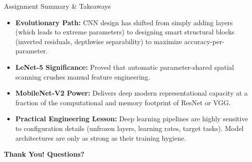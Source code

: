 \documentclass[aspectratio=169, 10pt]{beamer}
\begin{document}
\begin{frame}{Assignment Summary & Takeaways}
    \begin{itemize}
        \item \textbf{Evolutionary Path:} CNN design has shifted from simply adding layers (which leads to extreme parameters) to designing smart structural blocks (inverted residuals, depthwise separability) to maximize accuracy-per-parameter.
        \item \textbf{LeNet-5 Significance:} Proved that automatic parameter-shared spatial scanning crushes manual feature engineering.
        \item \textbf{MobileNet-V2 Power:} Delivers deep modern representational capacity at a fraction of the computational and memory footprint of ResNet or VGG.
        \item \textbf{Practical Engineering Lesson:} Deep learning pipelines are highly sensitive to configuration details (unfrozen layers, learning rates, target tasks). Model architectures are only as strong as their training hygiene.
    \end{itemize}
    \vspace{0.4cm}
    \centering
    \large\color{primary}\textbf{Thank You! Questions?}
\end{frame}
\end{document}
